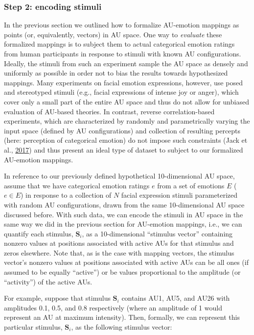 \documentclass[11pt,american,a4paper,oneside,]{memoir} %
\begin{document}
\hypertarget{step-2-encoding-stimuli}{%
\subsubsection{Step 2: encoding stimuli}\label{step-2-encoding-stimuli}}

In the previous section we outlined how to formalize AU-emotion mappings as points (or, equivalently, vectors) in AU space. One way to \emph{evaluate} these formalized mappings is to subject them to actual categorical emotion ratings from human participants in response to stimuli with known AU configurations. Ideally, the stimuli from such an experiment sample the AU space as densely and uniformly as possible in order not to bias the results towards hypothesized mappings. Many experiments on facial emotion expressions, however, use posed and stereotyped stimuli (e.g., facial expressions of intense joy or anger), which cover only a small part of the entire AU space and thus do not allow for unbiased evaluation of AU-based theories. In contrast, reverse correlation-based experiments, which are characterized by randomly and parametrically varying the input space (defined by AU configurations) and collection of resulting percepts (here: perception of categorical emotion) do not impose such constraints (Jack et al., \protect\hyperlink{ref-Jack2017-qp}{2017}) and thus present an ideal type of dataset to subject to our formalized AU-emotion mappings.

In reference to our previously defined hypothetical 10-dimensional AU space, assume that we have categorical emotion ratings \(e\) from a set of emotions \(E\) (\(e \in E\)) in response to a collection of \(N\) facial expression stimuli parameterized with random AU configurations, drawn from the same 10-dimensional AU space discussed before. With such data, we can encode the stimuli in AU space in the same way we did in the previous section for AU-emotion mappings, i.e., we can quantify each stimulus, \(\mathbf{S}_{i}\), as a 10-dimensional ``stimulus vector'' containing nonzero values at positions associated with active AUs for that stimulus and zeros elsewhere. Note that, as is the case with mapping vectors, the stimulus vector's nonzero values at positions associated with active AUs can be all ones (if assumed to be equally ``active'') or be values proportional to the amplitude (or ``activity'') of the active AUs.

For example, suppose that stimulus \(\mathbf{S}_{i}\) contains AU1, AU5, and AU26 with amplitudes 0.1, 0.5, and 0.8 respectively (where an amplitude of 1 would represent an AU at maximum intensity). Then, formally, we can represent this particular stimulus, \(\mathbf{S}_{i}\), as the following stimulus vector:
\end{document}
